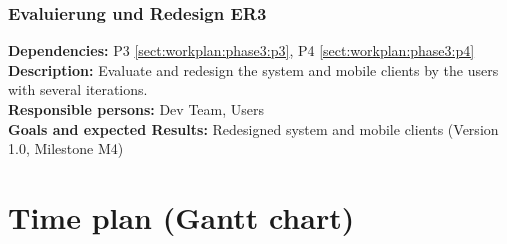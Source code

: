 \documentclass[a4paper,11pt]{article}
\begin{document}
\subsubsection{Evaluierung und Redesign ER3}
\label{sect:workplan:phase3:er3}
\textbf{Dependencies:} P3 \ref{sect:workplan:phase3:p3}, P4 \ref{sect:workplan:phase3:p4}\\
\textbf{Description:} Evaluate and redesign the system and mobile clients by the users with several iterations.\\
\textbf{Responsible persons:} Dev Team, Users\\
\textbf{Goals and expected Results:} Redesigned system and mobile clients (Version 1.0, Milestone M4)\\


\pagebreak
\section{Time plan (Gantt chart)}
\label{sect:timeplan}
\end{document}
